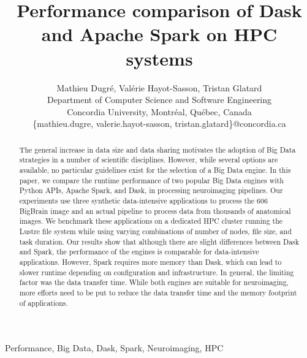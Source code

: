 \documentclass[conference]{IEEEtran}
\begin{document}
\title{Performance comparison of Dask and Apache Spark on HPC systems}

\author{Mathieu Dugr\'e, Val\'erie Hayot-Sasson, Tristan Glatard\\
	Department of Computer Science and Software Engineering\\
	Concordia University, Montr\'eal, Qu\'ebec, Canada\\
	\{mathieu.dugre, valerie.hayot-sasson, tristan.glatard\}@concordia.ca
	\vspace*{0.8cm} %
}

\maketitle

\begin{abstract}
	The general increase in data size and data sharing motivates the adoption of Big Data strategies in a number of scientific disciplines.
	However, while several options are available, no particular guidelines exist for the selection of a Big Data engine.
	In this paper, we compare the runtime performance of two popular Big Data engines with
	Python APIs, Apache Spark, and Dask, in processing neuroimaging pipelines.
	Our experiments use three synthetic data-intensive applications to process
	the \SI{606}{\gibi\byte} BigBrain image and an actual pipeline to process data
	from thousands of anatomical images.
	We benchmark these applications on a dedicated HPC cluster running the Lustre file system while using varying
	combinations of number of nodes, file size, and task duration.
	Our results show that although there are slight differences between Dask and Spark,
	the performance of the engines is comparable for data-intensive applications.
	However, Spark requires more memory than Dask, which can lead to 
	slower runtime depending on configuration and infrastructure.
	In general, the limiting factor was the data transfer time.
	While both engines are suitable for neuroimaging, more efforts need to be put
	to reduce the data transfer time and the memory footprint of applications.
						
\end{abstract}

\begin{IEEEkeywords}
	Performance, Big Data, Dask, Spark, Neuroimaging, HPC
\end{IEEEkeywords}
\end{document}
